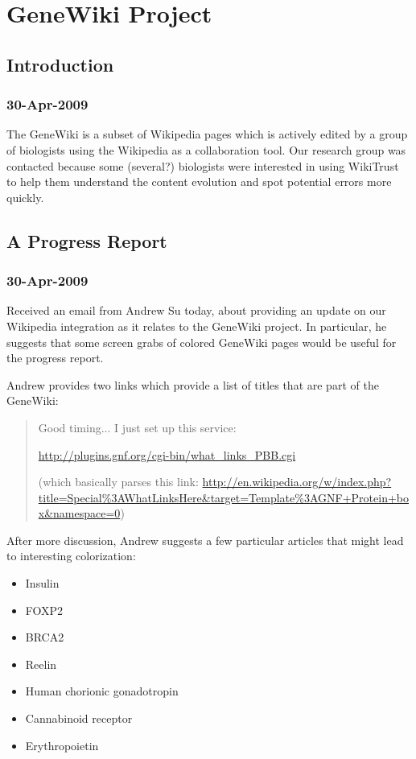 \chapter{GeneWiki Project}

\section{Introduction}

\subsection{30-Apr-2009}

The GeneWiki is a subset of Wikipedia pages which is actively
edited by a group of biologists using the Wikipedia as
a collaboration tool.
Our research group was contacted because some (several?)
biologists were interested in using WikiTrust to help them
understand the content evolution and spot potential errors
more quickly.

\section{A Progress Report}

\subsection{30-Apr-2009}

Received an email from Andrew Su today, about providing an
update on our Wikipedia integration as it relates to the GeneWiki project.
In particular, he suggests that some screen grabs of colored
GeneWiki pages would be useful for the progress report.

Andrew provides two links which provide a list of titles that
are part of the GeneWiki:
\begin{quote}
Good timing... I just set up this service:

\url{http://plugins.gnf.org/cgi-bin/what_links_PBB.cgi}

(which basically parses this link: \url{http://en.wikipedia.org/w/index.php?title=Special%3AWhatLinksHere&target=Template%3AGNF+Protein+box&namespace=0})
\end{quote}

After more discussion, Andrew suggests a few particular articles
that might lead to interesting colorization:
\begin{itemize}
\item Insulin
\item FOXP2
\item BRCA2
\item Reelin
\item Human chorionic gonadotropin
\item Cannabinoid receptor
\item Erythropoietin
\end{itemize}



